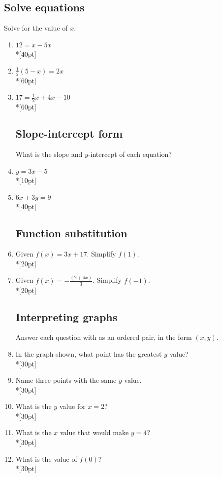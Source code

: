 \documentclass[12pt, oneside]{article}
\begin{document}
\subsection*{Solve equations}

Solve for the value of $x$.

\begin{enumerate}

\item   $12=x-5x$\\*[40pt]
\item   $\frac{1}{2}(5-x)=2x$\\*[60pt]
\item   $17=\frac{1}{2}x+4x-10$\\*[60pt]

\subsection*{Slope-intercept form}

What is the slope and $y$-intercept of each equation? 
\item   $y=3x-5$\\*[10pt]
\item   $6x+3y=9$\\*[40pt]


\subsection*{Function substitution}
\item Given $f(x)=3x+17$. Simplify $f(1)$.\\*[20pt]
\item Given $\displaystyle f(x)=-\frac{(2+4x)}{3}$. Simplify $f(-1)$.\\*[20pt]

\subsection*{Interpreting graphs}
Answer each question with as an ordered pair, in the form $(x, y)$.
\item In the graph shown, what point has the greatest $y$ value?\\*[30pt]
\item Name three points with the same $y$ value.\\*[30pt]
\item What is the $y$ value for $x=2$?\\*[30pt]
\item What is the $x$ value that would make $y=4$?\\*[30pt]
\item What is the value of $f(0)$?\\*[30pt]


\end{enumerate}
\end{document}
